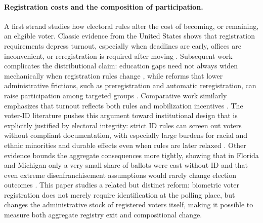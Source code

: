 \paragraph{Registration costs and the composition of participation.}
A first strand studies how electoral rules alter the cost of becoming, or remaining, an eligible voter. Classic evidence from the United States shows that registration requirements depress turnout, especially when deadlines are early, offices are inconvenient, or reregistration is required after moving \cite{Rosenstone1978TheEffectRegistra,Ansolabehere2005TheIntroducVoter}. Subsequent work complicates the distributional claim: education gaps need not always widen mechanically when registration rules change \cite{Nagler1991TheEffectRegistra}, while reforms that lower administrative frictions, such as preregistration and automatic reregistration, can raise participation among targeted groups \cite{Holbein2014MakingYoungVoters,Kim2022AutomatiVoterReregist}. Comparative work similarly emphasizes that turnout reflects both rules and mobilization incentives \cite{cox2015,frankMartinezComa2023,gaeblerEtAl2020}. The voter-ID literature pushes this argument toward institutional design that is explicitly justified by electoral integrity: strict ID rules can screen out voters without compliant documentation, with especially large burdens for racial and ethnic minorities and durable effects even when rules are later relaxed \cite{Fraga2021WhoVoterLaws,Hajnal2017VoterIdentifiLaws,Grimmer2021TheDurableDifferen}. Other evidence bounds the aggregate consequences more tightly, showing that in Florida and Michigan only a very small share of ballots were cast without ID and that even extreme disenfranchisement assumptions would rarely change election outcomes \cite{Hoekstra2019Strict}. This paper studies a related but distinct reform: biometric voter registration does not merely require identification at the polling place, but changes the administrative stock of registered voters itself, making it possible to measure both aggregate registry exit and compositional change.

